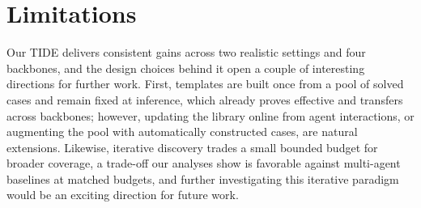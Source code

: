 \section*{Limitations}
Our \textsc{TIDE} delivers consistent gains across two realistic settings and four backbones, and the design choices behind it open a couple of interesting directions for further work.
First, templates are built once from a pool of solved cases and remain fixed at inference, which already proves effective and transfers across backbones; however, updating the library online from agent interactions, or augmenting the pool with automatically constructed cases, are natural extensions.
Likewise, iterative discovery trades a small bounded budget for broader coverage, a trade-off our analyses show is favorable against multi-agent baselines at matched budgets, and further investigating this iterative paradigm would be an exciting direction for future work.
